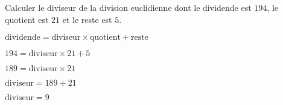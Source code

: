 \begin{exercice*}
    Calculer le diviseur de la division euclidienne dont le dividende est $194$,
    le quotient est $21$ et le reste est $5$.
\end{exercice*}
\begin{corrige}
    $\text{dividende}=\text{diviseur}\times \text{quotient} + \text{reste}$
    
    $194=\text{diviseur}\times 21 + 5$

    $189=\text{diviseur}\times 21$

    $\text{diviseur} = 189\div 21$

    $\text{diviseur} = 9$
\end{corrige}

